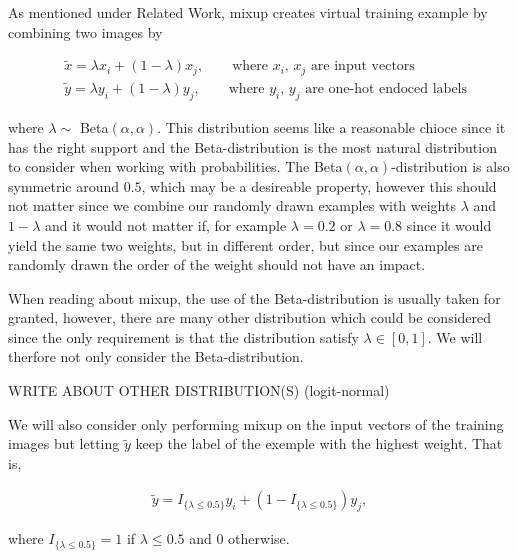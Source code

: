 \documentclass{article}
\begin{document}
As mentioned under Related Work, mixup creates virtual training example by combining two images by 

\begin{align*}
&\tilde{x} = \lambda x_i + (1-\lambda) x_j, \qquad \text{where $x_i$, $x_j$ are input vectors} \\
&\tilde{y} = \lambda y_i + (1-\lambda) y_j, \qquad \text{where $y_i$, $y_j$ are one-hot endoced labels}
\end{align*}

where $\lambda \sim$ Beta$(\alpha, \alpha)$.
 This distribution seems like a 
reasonable chioce since it has the right support and the Beta-distribution is the most natural distribution to
consider when working with probabilities. The Beta$(\alpha, \alpha)$-distribution is also symmetric around $0.5$, which may be 
a desireable property, however this should not matter since we combine our randomly drawn examples with weights $\lambda$ and $1-\lambda$ and 
it would not matter if, for example $\lambda = 0.2$ or $\lambda = 0.8$ since it would yield the same two weights, but in different order, but 
since our examples are randomly drawn the order of the weight should not have an impact. 

When reading about mixup, the use of the Beta-distribution is usually taken for granted, however, there are many other distribution which 
could be considered since the only requirement is that the distribution satisfy $\lambda \in [0,1]$. We will therfore not only consider the 
Beta-distribution. 

WRITE ABOUT OTHER DISTRIBUTION(S) (logit-normal)

We will also consider only performing mixup on the input vectors of the training images but letting $\tilde{y}$ keep the label of the exemple 
with the highest weight. That is,

\begin{align*}
\tilde{y} = I_{\{ \lambda \leq 0.5 \}} y_i + (1-I_{\{ \lambda \leq 0.5 \}}) y_j, 
\end{align*}

where $I_{\{ \lambda \leq 0.5 \}} = 1$ if $\lambda \leq 0.5$ and $0$ otherwise.
\end{document}
